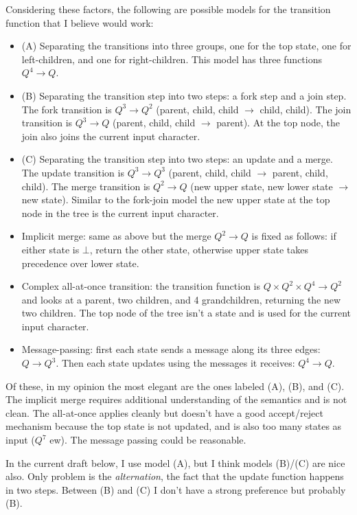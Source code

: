 \documentclass{article}
\theoremstyle{definition}
\begin{document}
Considering these factors, the following are possible models for the transition function that I believe would work:
\begin{itemize}
\item (A) Separating the transitions into three groups, one for the
top state, one for left-children, and one for right-children.
This model has three functions $Q^4 \to Q$.
\item (B) Separating the transition step into two steps: a fork step and a join step. The fork transition is $Q^3 \to Q^2$ (parent, child, child $\to$ child, child). The join transition is $Q^3 \to Q$ (parent, child, child $\to$ parent).
At the top node, the join also joins the current input character.
\item (C) Separating the transition step into two steps: an update and a merge.
The update transition is $Q^3 \to Q^3$ (parent, child, child $\to$ parent, child, child). The merge transition is $Q^2 \to Q$ (new upper state, new lower state $\to$ new state). Similar to the fork-join model the new upper state at the top node in the tree is the current input character.
\item Implicit merge: same as above but the merge $Q^2 \to Q$ is fixed as follows: if either state is $\bot$, return the other state, otherwise upper state takes precedence over lower state.
\item Complex all-at-once transition: the transition function is $Q \times Q^2 \times Q^4 \to Q^2$ and looks at a parent, two children, and 4 grandchildren, returning the new two children. The top node of the tree isn't a state and is used for the current input character.
\item Message-passing: first each state sends a message along its three edges: $Q \to Q^3$. Then each state updates using the messages it receives: $Q^4 \to Q$.
\end{itemize}

Of these, in my opinion the most elegant are the ones labeled (A), (B), and (C). The implicit merge requires additional understanding of the semantics and is not clean. The all-at-once applies cleanly but doesn't have a good accept/reject mechanism because the top state is not updated, and is also too many states as input ($Q^7$ ew). The message passing could be reasonable.

In the current draft below, I use model (A), but I think models (B)/(C) are nice also. Only problem is the \emph{alternation}, the fact that the update function happens in two steps.
Between (B) and (C) I don't have a strong preference but probably (B).
\end{document}
